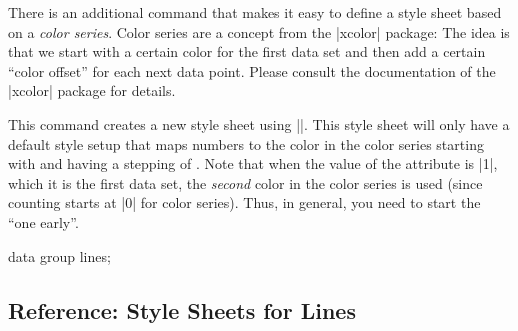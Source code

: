 There is an additional command that makes it easy to define a style sheet based
on a \emph{color series}. Color series are a concept from the |xcolor| package:
The idea is that we start with a certain color for the first data set and then
add a certain ``color offset'' for each next data point. Please consult the
documentation of the |xcolor| package for details.

\begin{command}{\tikzdvdeclarestylesheetcolorseries{}}
    This command creates a new style sheet using |\pgfdvdeclarestylesheet|.
    This style sheet will only have a default style setup that maps numbers to
    the color in the color series starting with  and having
    a stepping of . Note that when the value of the attribute is
    |1|, which it is the first data set, the \emph{second} color in the color
    series is used (since counting starts at |0| for color series). Thus, in
    general, you need to start the  ``one early''.
\begin{codeexample}[
    preamble={\usetikzlibrary{datavisualization}},
    pre={\tikz \datavisualization data group {lines} = {
    data point [x=0, y=0,       set=normal]
    data point [x=2, y=2,       set=normal]
    data point [x=0, y=1,       set=heated]
    data point [x=2, y=1,       set=heated]
    data point [x=0.5, y=1.5,   set=critical]
    data point [x=2.25, y=1.75, set=critical]
};},
]
\tikz \datavisualization [
  school book axes,
  visualize as line=normal,
  visualize as line=heated,
  visualize as line=critical,
  style sheet=greens]
data group {lines};
\end{codeexample}
\end{command}


\subsection{Reference: Style Sheets for Lines}


